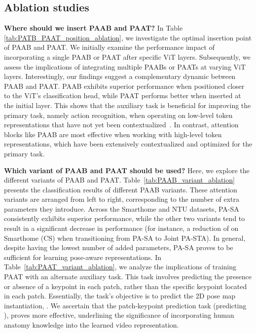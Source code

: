 \documentclass{article}
\begin{document}
\begin{table}
    \label{tab:paab_paat_ablation} \vspace{-0.2in}
\end{table}


\subsection{Ablation studies}
\textbf{Where should we insert PAAB and PAAT?}\quad
In Table \ref{tab:PATB_PAAT_position_ablation}, we investigate the optimal insertion point of PAAB and PAAT. We initially examine the performance impact of incorporating a single PAAB or PAAT after specific ViT layers. Subsequently, we assess the implications of integrating multiple PAABs or PAATs at varying ViT layers. Interestingly, our findings suggest a complementary dynamic between PAAB and PAAT. PAAB exhibits superior performance when positioned closer to the ViT's classification head, while PAAT performs better when inserted at the initial layer. 
This shows that the auxiliary task is beneficial for improving the primary task, namely action recognition, when operating on low-level token representations that have not yet been contextualized~\cite{attn_rollout}.
In contrast, attention blocks like PAAB are most effective when working with high-level token representations, which have been extensively contextualized and optimized for the primary task.



 
\textbf{Which variant of PAAB and PAAT should be used?}\quad
Here, we explore the different variants of PAAB and PAAT. Table~\ref{tab:PAAB_variant_ablation} presents the classification results of different PAAB variants. These attention variants are arranged from left to right, corresponding to the number of extra parameters they introduce. Across the Smarthome and NTU datasets, PA-SA consistently exhibits superior performance, while the other two variants tend to result in a significant decrease in performance (for instance, a reduction of  on Smarthome (CS) when transitioning from PA-SA to Joint PA-STA). In general, despite having the lowest number of added parameters, PA-SA proves to be sufficient for learning pose-aware representations.
In Table~\ref{tab:PAAT_variant_ablation}, we analyze the implications of training PAAT with an alternate auxiliary task. This task involves predicting the presence or absence of a keypoint in each patch, rather than the specific keypoint located in each patch. Essentially, the task's objective is to predict the 2D pose map instantiation, . We ascertain that the patch-keypoint prediction task (predicting ), proves more effective, underlining the significance of incorporating human anatomy knowledge into the learned video representation.
\end{document}
